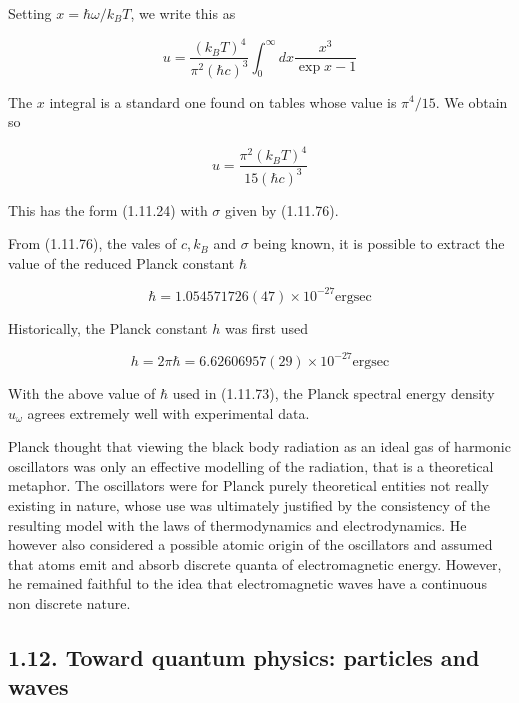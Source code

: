 \documentclass{article}
\begin{document}
Setting $x=\hbar \omega / k_{B} T$, we write this as
 
\begin{equation*}
u=\frac{\left(k_{B} T\right)^{4}}{\pi^{2}(\hbar c)^{3}} \int_{0}^{\infty} d x \frac{x^{3}}{\exp x-1} \tag{1.11.78}
\end{equation*}
 

The $x$ integral is a standard one found on tables whose value is $\pi^{4} / 15$. We obtain so
 
\begin{equation*}
u=\frac{\pi^{2}\left(k_{B} T\right)^{4}}{15(\hbar c)^{3}} \tag{1.11.79}
\end{equation*}
 

This has the form (1.11.24) with $\sigma$ given by (1.11.76).

From (1.11.76), the vales of $c, k_{B}$ and $\sigma$ being known, it is possible to extract the value of the reduced Planck constant $\hbar$
 
\begin{equation*}
\hbar=1.054571726(47) \times 10^{-27} \mathrm{erg} \mathrm{sec} \tag{1.11.80}
\end{equation*}
 

Historically, the Planck constant $h$ was first used
 
\begin{equation*}
h=2 \pi \hbar=6.62606957(29) \times 10^{-27} \mathrm{erg} \mathrm{sec} \tag{1.11.81}
\end{equation*}
 

With the above value of $\hbar$ used in (1.11.73), the Planck spectral energy density $u_{\omega}$ agrees extremely well with experimental data.

Planck thought that viewing the black body radiation as an ideal gas of harmonic oscillators was only an effective modelling of the radiation, that is a theoretical metaphor. The oscillators were for Planck purely theoretical entities not really existing in nature, whose use was ultimately justified by the consistency of the resulting model with the laws of thermodynamics and electrodynamics. He however also considered a possible atomic origin of the oscillators and assumed that atoms emit and absorb discrete quanta of electromagnetic energy. However, he remained faithful to the idea that electromagnetic waves have a continuous non discrete nature.

\subsection*{1.12. Toward quantum physics: particles and waves}
\end{document}
